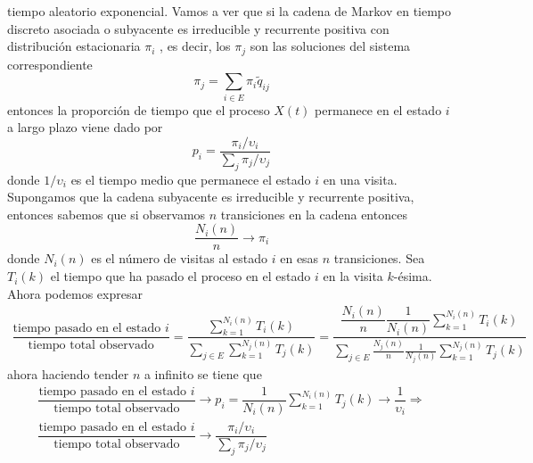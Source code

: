 tiempo aleatorio exponencial. Vamos a ver que si la cadena de
Markov en tiempo discreto asociada o subyacente es irreducible y
recurrente positiva con distribuci\'{o}n estacionaria $\pi_i$ , es
decir, los $\pi_j$ son las soluciones del sistema correspondiente
\[
\pi_j=\displaystyle\sum_{i\in E}\pi_i \tilde q_{ij}
\]
entonces la proporci\'{o}n de tiempo que el proceso $X(t)$ permanece
en el estado $i$ a largo plazo viene dado por
\[
p_i=\dfrac{\pi_i/\upsilon_i}{\displaystyle\sum_j \pi_j/\upsilon_j}
\]
donde $1/\upsilon_i$ es el tiempo medio que permanece el estado
$i$ en una visita. Supongamos que la cadena subyacente es
irreducible y recurrente positiva, entonces sabemos que si
observamos $n$ transiciones en la cadena entonces
\[
\dfrac{N_i(n)}{n}\to \pi_i
\]
donde $N_i(n)$ es el n\'{u}mero de visitas al estado $i$ en esas $n$
transiciones. Sea $T_i(k)$ el tiempo que ha pasado el proceso en
el estado $i$ en la visita $k$-\'{e}sima. Ahora podemos expresar
\[
\begin{array}{l}
\dfrac{\text{tiempo pasado en el estado $i$}}{\text{tiempo total
observado}}=\dfrac{\displaystyle\sum_{k=1}^{N_i(n)}T_i(k)}{\displaystyle\sum_{j\in
E}\displaystyle\sum_{k=1}^{N_j(n)}T_j(k)}=
\dfrac{\dfrac{N_i(n)}{n}\dfrac{1}{N_i(n)}\displaystyle\sum_{k=1}^{N_i(n)}T_i(k)}
{\displaystyle\sum_{j\in
E}\frac{N_j(n)}{n}\frac{1}{N_j(n)}\displaystyle\sum_{k=1}^{N_j(n)}T_j(k)}
\end{array}
\]
ahora haciendo tender $n$ a infinito se tiene que
\[
 \begin{array}{l}
 \dfrac{\text{tiempo pasado en el estado $i$}}{\text{tiempo total
observado}}\to p_i=
\dfrac{1}{N_i(n)}\displaystyle\sum_{k=1}^{N_i(n)}T_j(k)\to
\dfrac{1}{\upsilon_i}\Rightarrow\\[10pt] \dfrac{\text{tiempo pasado en el
estado $i$}}{\text{tiempo total observado}}\to
\dfrac{\pi_i/\upsilon_i}{\displaystyle\sum_j \pi_j/\upsilon_j}
\end{array}
\]
